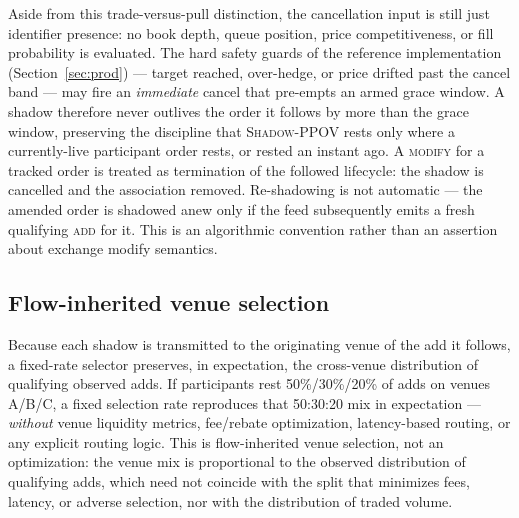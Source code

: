 \documentclass[11pt]{article}
\newcommand{\pov}{\textsc{Shadow-PPOV}}
\begin{document}
Aside from this trade-versus-pull
distinction, the cancellation input is still just identifier presence: no book
depth, queue position, price competitiveness, or fill probability is evaluated.
The hard safety guards of the reference implementation
(Section~\ref{sec:prod}) --- target reached, over-hedge, or price drifted past
the cancel band --- may fire an \emph{immediate} cancel that pre-empts an armed
grace window. A shadow therefore never outlives the order it follows by more
than the grace window, preserving the discipline that \pov{} rests only where a
currently-live participant order rests, or rested an instant ago. A
\textsc{modify} for a tracked order is treated as termination of the followed
lifecycle: the shadow is cancelled and the association removed. Re-shadowing is
not automatic --- the amended order is shadowed anew only if the feed subsequently
emits a fresh qualifying \textsc{add} for it. This is an algorithmic convention
rather than an assertion about exchange modify semantics.

\subsection{Flow-inherited venue selection}
\label{sec:sor}

Because each shadow is transmitted to the originating venue of the add it
follows, a fixed-rate selector preserves, in expectation, the cross-venue
distribution of qualifying observed adds. If participants rest 50\%/30\%/20\%
of adds on venues A/B/C, a fixed selection rate reproduces that 50:30:20 mix
in expectation --- \emph{without} venue liquidity metrics, fee/rebate
optimization, latency-based routing, or any explicit routing logic. This is
flow-inherited venue selection, not an optimization: the venue mix is
proportional to the observed distribution of qualifying adds, which need not
coincide with the split that minimizes fees, latency, or adverse selection, nor
with the distribution of traded volume.
\end{document}
